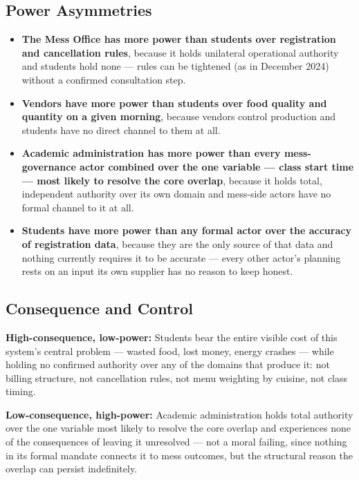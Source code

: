 \documentclass[11pt]{article}
\begin{document}
\subsection{Power Asymmetries}

\begin{itemize}
    \item \textbf{The Mess Office has more power than students over registration and
        cancellation rules}, because it holds unilateral operational authority and
        students hold none --- rules can be tightened (as in December 2024) without a
        confirmed consultation step.
    \item \textbf{Vendors have more power than students over food quality and
        quantity on a given morning}, because vendors control production and
        students have no direct channel to them at all.
    \item \textbf{Academic administration has more power than every mess-governance
        actor combined over the one variable --- class start time --- most likely to
        resolve the core overlap}, because it holds total, independent authority
        over its own domain and mess-side actors have no formal channel to it at
        all.
    \item \textbf{Students have more power than any formal actor over the accuracy of
        registration data}, because they are the only source of that data and
        nothing currently requires it to be accurate --- every other actor's
        planning rests on an input its own supplier has no reason to keep honest.
\end{itemize}

\subsection{Consequence and Control}

\textbf{High-consequence, low-power:} Students bear the entire visible cost of this
system's central problem --- wasted food, lost money, energy crashes --- while
holding no confirmed authority over any of the domains that produce it: not billing
structure, not cancellation rules, not menu weighting by cuisine, not class timing.

\textbf{Low-consequence, high-power:} Academic administration holds total authority
over the one variable most likely to resolve the core overlap and experiences none of
the consequences of leaving it unresolved --- not a moral failing, since nothing in
its formal mandate connects it to mess outcomes, but the structural reason the
overlap can persist indefinitely.
\end{document}
